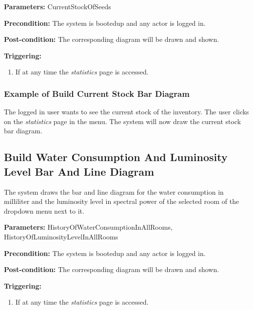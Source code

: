 \begin{description}

\item \textbf{Parameters:} CurrentStockOfSeeds
\item \textbf{Precondition:} The system is bootedup and any actor is logged in.
\item \textbf{Post-condition:} The corresponding diagram will be drawn and
shown.

\item \textbf{Triggering:}
\begin{enumerate}
\item If at any time the \emph{statistics} page is accessed.
\end{enumerate}
\end{description}

\subsubsection{Example of Build Current Stock Bar Diagram}
The logged in user wants to see the current stock of the inventory.
The user clicks on the \emph{statistics} page in the menu.
The system will now draw the current stock bar diagram.



\break
\subsection{Build Water Consumption And Luminosity Level Bar And Line Diagram}
\label{operation:BuildWaterConsumptionAndLuminosityLevelDiagram}
The system draws the bar and line diagram for the water consumption in
milliliter and the luminosity level in spectral power of the selected room of
the dropdown menu next to it.

\begin{description}

\item \textbf{Parameters:} HistoryOfWaterConsumptionInAllRooms,
HistoryOfLuminosityLevelInAllRooms
\item \textbf{Precondition:} The system is bootedup and any actor is logged in.
\item \textbf{Post-condition:} The corresponding diagram will be drawn and
shown.

\item \textbf{Triggering:}
\begin{enumerate}
\item If at any time the \emph{statistics} page is accessed.
\end{enumerate}
\end{description}

